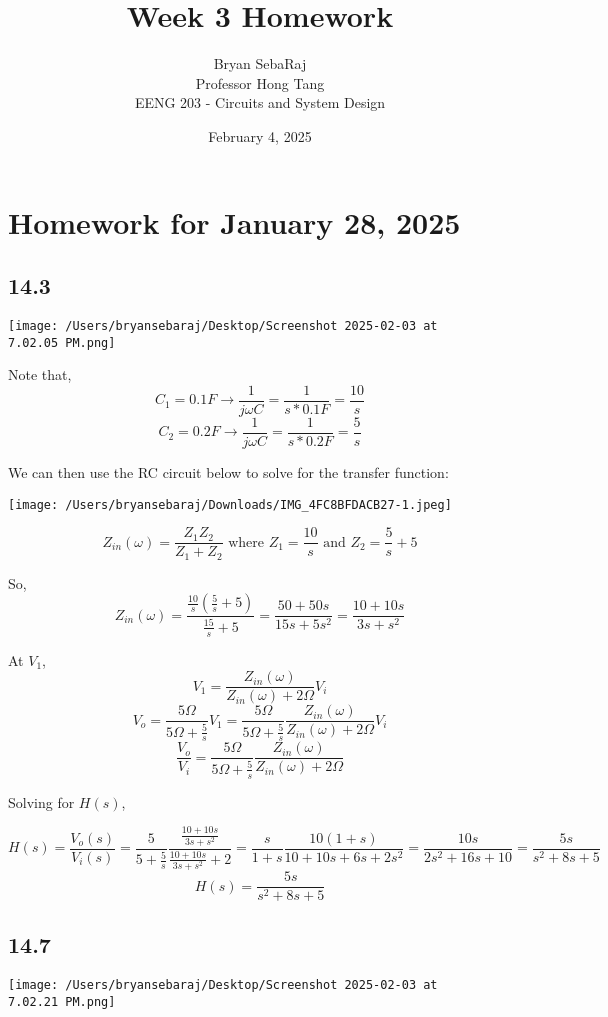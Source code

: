 \documentclass{article}
\title{Week 3 Homework}
\author{Bryan SebaRaj \\[0.7em] Professor Hong Tang \\[0.7em]  EENG 203 - Circuits and System Design}
\date{February 4, 2025}
\begin{document}
\maketitle

\section*{Homework for January 28, 2025}

\subsection*{14.3}
\texttt{[image: /Users/bryansebaraj/Desktop/Screenshot 2025-02-03 at 7.02.05 PM.png]}

Note that, $$C_1  = 0.1 F \rightarrow \frac{1}{j\omega C}= \frac{1}{s * 0.1F}  = \frac{10}{s}$$
$$C_2  = 0.2 F \rightarrow \frac{1}{j\omega C}= \frac{1}{s * 0.2 F} = \frac{5}{s}$$

We can then use the RC circuit below to solve for the transfer function:

\texttt{[image: /Users/bryansebaraj/Downloads/IMG\_4FC8BFDACB27-1.jpeg]}

$$Z_{in}(\omega)= \frac{Z_1 Z_2}{Z_1 + Z_2} \text{ where } Z_1 = \frac{10}{s} \text{ and } Z_2 = \frac{5}{s} + 5$$

So, $$Z_{in}(\omega) = \frac{\frac{10}{s} (\frac{5}{s} + 5)}{\frac{15}{s} + 5} = \frac{50 + 50s}{15s + 5s^2}=\frac{10 + 10s}{3s + s^2}$$

At $V_1$, $$V_1 = \frac{Z_{in}(\omega)}{Z_{in}(\omega) + 2 \Omega}V_i$$
$$V_o = \frac{5 \Omega}{5 \Omega + \frac{5}{s}}V_1 = \frac{5 \Omega}{5 \Omega + \frac{5}{s}}\frac{Z_{in}(\omega)}{Z_{in}(\omega) + 2 \Omega}V_i$$
$$\frac{V_o}{V_i}=\frac{5 \Omega}{5 \Omega + \frac{5}{s}}\frac{Z_{in}(\omega)}{Z_{in}(\omega) + 2 \Omega}$$

Solving for $H(s)$,

$$H(s) = \frac{V_o(s)}{V_i(s)} = \frac{5}{5 + \frac{5}{s}}\frac{\frac{10 + 10s}{3s + s^2}}{\frac{10 + 10s}{3s + s^2} + 2 } = \frac{s}{1+s}\frac{10 (1 + s)}{10 + 10 s + 6s + 2s^2}=\frac{10s}{2s^2 + 16s + 10}=\frac{5s}{s^2 + 8s + 5}$$
$$H(s) = \frac{5s}{s^2 + 8s + 5}$$

\subsection*{14.7}
\texttt{[image: /Users/bryansebaraj/Desktop/Screenshot 2025-02-03 at 7.02.21 PM.png]}
\end{document}
